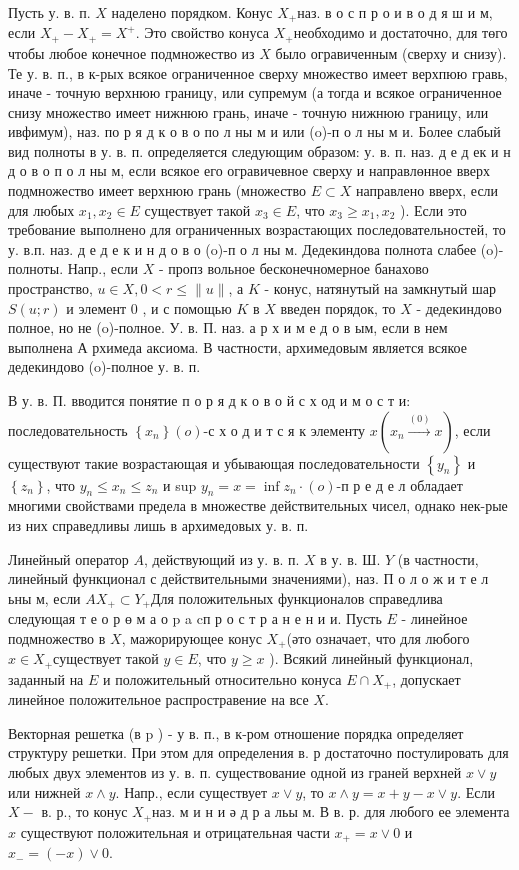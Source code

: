 \documentclass[10pt]{article}
\begin{document}
Пусть у. в. п. $X$ наделено порядком. Конус $X_{+}$наз. в о с п р о и в о д я ш и м, если $X_{+}-X_{+}=X^{+}$. Это свойство конуса $X_{+}$необходимо и достаточно, для төго чтобы любое конечное подмножество из $X$ было огравиченным (сверху и снизу). Те у. в. п., в к-рых всякое ограниченное сверху множество имеет верхпюю гравь, иначе - точную верхнюю границу, или супремум (а тогда и всякое ограниченное снизу множество имеет нижнюю грань, иначе - точную нижнюю границу, или ивфимум), наз. по р я д к о в о по л ны м и или (o)-п о л ны м и. Более слабый вид полноты в у. в. п. определяется следующим образом: у. в. п. наз. д е д ек и н д о в о п о л ны м, если всякое его огравичевное сверху и направлөнное вверх подмножество имеет верхнюю грань (множество $E \subset X$ направлено вверх, если для любых $x_{1}, x_{2} \in E$ существует такой $x_{3} \in E$, что $x_{3} \geqslant x_{1}, x_{2}$ ). Если это требование выполнено для ограниченных возрастающих последовательностей, то у. в.п. наз. д е д е к и н д о в о (o)-п о л ны м. Дедекиндова полнота слабее (o)-полноты. Напр., если $X$ - пропз вольное бесконечномерное банахово пространство, $u \in X, 0<r \leqslant\|u\|$, а $K$ - конус, натянутый на замкнутый шар $S(u ; r)$ и элемент 0 , и с помощью $K$ в $X$ введен порядок, то $X$ - дедекиндово полное, но не (o)-полное. У. в. П. наз. а р х и м е д о в ым, если в нем выполнена А рхимеда аксиома. В частности, архимедовым является всякое дедекиндово (o)-полное у. в. п.



В у. в. П. вводится понятие п о р я д к о в о й с х од и м о с т и: последовательность $\left\{x_{n}\right\}(o)$-с х о д и т с я к элементу $x\left(x_{n} \stackrel{(0)}{\longrightarrow} x\right)$, если существуют такие возрастающая и убывающая последовательности $\left\{y_{n}\right\}$ и $\left\{z_{n}\right\}$, что $y_{n} \leqslant x_{n} \leqslant z_{n}$ и sup $y_{n}=x=\inf z_{n} \cdot(o)$-п р е д е л обладает многими свойствами предела в множестве действительных чисел, однако нек-рые из них справедливы лишь в архимедовых у. в. п.



Линейный оператор $A$, действующий из у. в. п. $X$ в у. в. Ш. $Y$ (в частности, линейный функционал с действительными значениями), наз. П о л о ж и т е л ьны м, если $A X_{+} \subset Y_{+}$Для положительных функционалов справедлива следующая т е о р ө м а о p a cп р о с т р а н е н и и. Пусть $E$ - линейное подмножество в $X$, мажорирующее конус $X_{+}$(әто означает, что для любого $x \in X_{+}$существует такой $y \in E$, что $y \geqslant x$ ). Всякий линейный функционал, заданный на $E$ и положительный относительно конуса $E \cap X_{+}$, допускает линейное положительное распростравение на все $X$.



Векторная решетка (в p ) - у в. п., в к-ром отношение порядка определяет структуру решетки. При этом для определения в. р достаточно постулировать для любых двух элементов из у. в. п. существование одной из граней верхней $x \vee y$ или нижней $x \wedge y$. Напр., если существует $x \vee y$, то $x \wedge y=x+y-x \vee y$. Если $X-$ в. р., то конус $X_{+}$наз. м и н и ә д р а льы м. В в. р. для любого ее элемента $x$ существуют положительная и отрицательная части $x_{+}=x \vee 0$ и $x_{-}=(-x) \vee 0$.
\end{document}
